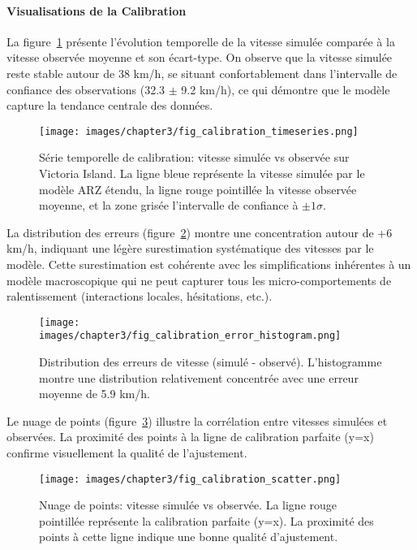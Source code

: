 \paragraph{Visualisations de la Calibration}

La figure~\ref{fig:calibration_timeseries_74} présente l'évolution temporelle de la vitesse
simulée comparée à la vitesse observée moyenne et son écart-type. On observe que la vitesse
simulée reste stable autour de 38 km/h, se situant confortablement dans l'intervalle de confiance des observations
(32.3 $\pm$ 9.2 km/h), ce qui démontre que le modèle capture la tendance centrale des données.

\begin{figure}[htbp]
    \centering
    \texttt{[image: images/chapter3/fig\_calibration\_timeseries.png]}
    \caption{Série temporelle de calibration: vitesse simulée vs observée sur Victoria Island.
        La ligne bleue représente la vitesse simulée par le modèle ARZ étendu,
        la ligne rouge pointillée la vitesse observée moyenne, et la zone grisée
        l'intervalle de confiance à $\pm 1\sigma$.}
    \label{fig:calibration_timeseries_74}
\end{figure}

La distribution des erreurs (figure~\ref{fig:calibration_error_histogram_74}) montre
une concentration autour de +6 km/h, indiquant une légère surestimation systématique
des vitesses par le modèle. Cette surestimation est cohérente avec les simplifications
inhérentes à un modèle macroscopique qui ne peut capturer tous les micro-comportements de ralentissement (interactions locales, hésitations, etc.).

\begin{figure}[htbp]
    \centering
    \texttt{[image: images/chapter3/fig\_calibration\_error\_histogram.png]}
    \caption{Distribution des erreurs de vitesse (simulé - observé). L'histogramme montre
        une distribution relativement concentrée avec une erreur moyenne de 5.9 km/h.}
    \label{fig:calibration_error_histogram_74}
\end{figure}

Le nuage de points (figure~\ref{fig:calibration_scatter_74}) illustre la corrélation
entre vitesses simulées et observées. La proximité des points à la ligne de calibration
parfaite (y=x) confirme visuellement la qualité de l'ajustement.

\begin{figure}[htbp]
    \centering
    \texttt{[image: images/chapter3/fig\_calibration\_scatter.png]}
    \caption{Nuage de points: vitesse simulée vs observée. La ligne rouge pointillée représente
        la calibration parfaite (y=x). La proximité des points à cette ligne indique
        une bonne qualité d'ajustement.}
    \label{fig:calibration_scatter_74}
\end{figure}



